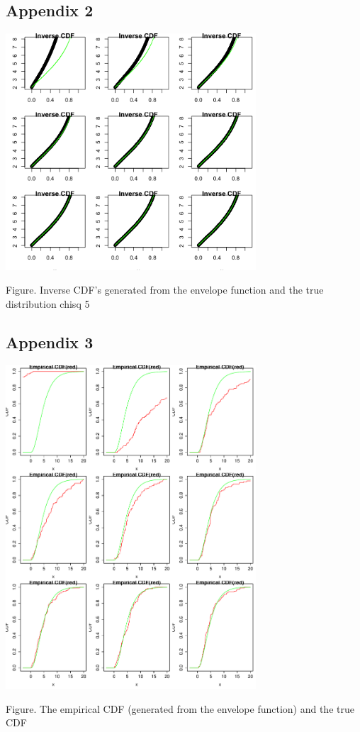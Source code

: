 \documentclass{article}\usepackage[]{graphicx}\usepackage[]{color}
\begin{document}
\subsection{Appendix 2}

\begin{center}
\includegraphics[width=0.7\textwidth]{figure/inverseCDFchi5}
\end{center}
\begin{center}
Figure. Inverse CDF's generated from the envelope function and the true distribution chisq 5
\end{center}

\subsection{Appendix 3}

\begin{center}
\includegraphics[width=0.7\textwidth]{figure/testUpperSample}
\end{center}
\begin{center}
Figure. The empirical CDF (generated from the envelope function) and the true CDF
\end{center}
\end{document}
